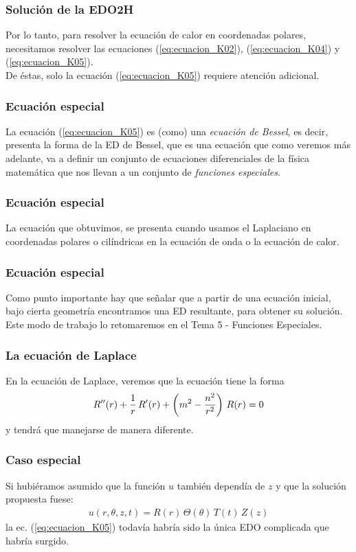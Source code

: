 \documentclass[12pt]{beamer}
\begin{document}
\begin{frame}
\frametitle{Solución de la EDO2H}
Por lo tanto, para resolver la ecuación de calor en coordenadas polares, necesitamos resolver las ecuaciones (\ref{eq:ecuacion_K02}), (\ref{eq:ecuacion_K04}) y (\ref{eq:ecuacion_K05}).
\\
\bigskip
\pause
De éstas, solo la ecuación (\ref{eq:ecuacion_K05}) requiere atención adicional.
\end{frame}
\begin{frame}
\frametitle{Ecuación especial}
La ecuación (\ref{eq:ecuacion_K05}) es (como) una \emph{ecuación de Bessel}, es decir, presenta la forma de la ED de Bessel, que es una ecuación que como veremos más adelante, va a definir un conjunto de ecuaciones diferenciales de la física matemática que nos llevan a un conjunto de \emph{funciones especiales}.
\end{frame}
\begin{frame}
\frametitle{Ecuación especial}
La ecuación que obtuvimos, se presenta cuando usamos el Laplaciano en coordenadas polares o cilíndricas en la ecuación de onda o la ecuación de calor.
\end{frame}
\begin{frame}
\frametitle{Ecuación especial}
Como punto importante hay que señalar que a partir de una ecuación inicial, bajo cierta geometría encontramos una ED resultante, para obtener su solución. Este modo de trabajo lo retomaremos en el Tema 5 - Funciones Especiales.
\end{frame}
\begin{frame}
\frametitle{La ecuación de Laplace}
En la ecuación de Laplace, veremos que la ecuación tiene la forma
\begin{align*}
{R}^{\prime \prime} (r) + \dfrac{1}{r} \, {R}^{\prime} (r) + \left( m^{2} - \dfrac{n^{2}}{r^{2}} \right) \, R(r) = 0
\end{align*}
y tendrá que manejarse de manera diferente.
\end{frame}
\begin{frame}
\frametitle{Caso especial}
Si hubiéramos asumido que la función $u$ también dependía de $z$ y que la solución propuesta fuese:
\begin{align*}
u(r, \theta, z, t) =  R(r) \, \Theta (\theta) \, T(t) \, Z(z)
\end{align*}
la ec. (\ref{eq:ecuacion_K05}) todavía habría sido la única EDO complicada que habría surgido.
\end{frame}
\end{document}
